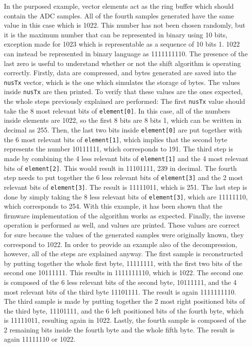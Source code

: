 \documentclass{Configuration_Files/PoliMi3i_thesis}
\begin{document}
In the purposed example, vector elements act as the ring buffer which should contain the ADC samples. All of the fourth samples generated have the same value in this case which is 1022. This number has not been chosen randomly, but it is the maximum number that can be represented in binary using 10 bits, exception made for 1023 which is representable as a sequence of 10 bits 1. 1022 can instead be represented in binary language as 1111111110. The presence of the last zero is useful to understand whether or not the shift algorithm is operating correctly. Firstly, data are compressed, and bytes generated are saved into the \texttt{nusTx} vector, which is the one which simulates the storage of bytes. The values inside \texttt{nusTx} are then printed. To verify that these values are the ones expected, the whole steps previously explained are performed:
The first \texttt{nusTx} value should take the 8 most relevant bits of \texttt{element[0]}. In this case, all of the numbers inside elements are 1022, so the first 8 bits are 8 bits 1, which can be written in decimal as 255.
Then, the last two bits inside \texttt{element[0]} are put together with the 6 most relevant bits of \texttt{element[1]}, which implies that the second byte represents the number 10111111, which corresponds to 191.
The third step is made by combining the 4 less relevant bits of \texttt{element[1]} and the 4 most relevant bits of \texttt{element[2]}. This would result in 11101111, 239 in decimal.
The fourth step needs to put together the 6 less relevant bits of \texttt{element[3]} and the 2 most relevant bits of \texttt{element[3]}. The result is 11111011, which is 251.
The last step is done by simply taking the 8 less relevant bits of \texttt{element[3]}, which are 11111110, which corresponds to 254.
With this example, it has been shown that the firmware implementation of the algorithm works as expected. Finally, the inverse operation is performed as well, and values are printed. These values are correct for sure because the values of the generated samples were originally known, they correspond to 1022. In order to provide an example also of the decompression, however, all of the steps are explained anyway.
The first sample is reconstructed by putting together the whole first byte, 11111111, with the first two bits of the second one 10111111. This results in 1111111110, which is 1022.
The second one is composed of the 6 less relevant bits of the second byte, 10111111, and the 4 most relevant bits of the third byte 11101111. The result is again 1111111110.
The third sample is made by putting together the 2 most right positioned bits of the third byte, 11101111, and the 6 left positioned bits of the fourth byte, which is 11111011, resulting again in 1022.
Lastly, the fourth sample is composed of the 2 remaining bits inside the fourth byte and the whole fifth byte. The result is again 11111110 or 1022.
\end{document}
